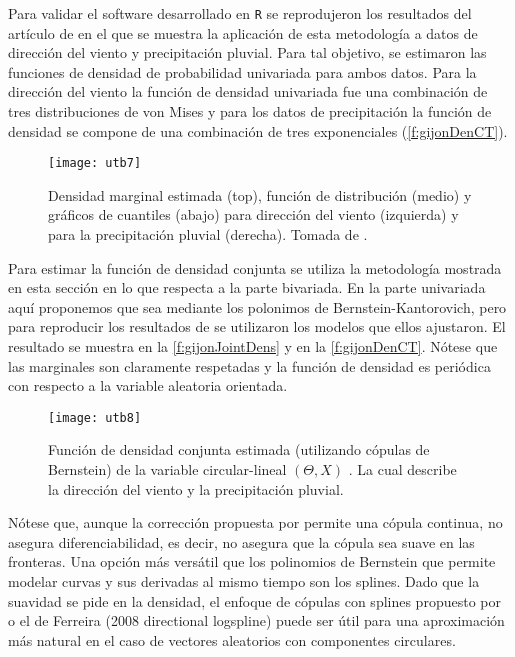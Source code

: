 Para validar el software desarrollado en \verb|R| se reprodujeron los resultados del art\'iculo de \citet{carnicero_non-parametric_2013} en el que se muestra la aplicaci\'on de esta metodolog\'ia a datos de direcci\'on del viento y precipitaci\'on pluvial. Para tal objetivo, se estimaron las funciones de densidad de probabilidad univariada para ambos datos. Para la direcci\'on del viento la funci\'on de densidad univariada fue una combinaci\'on de tres distribuciones de von Mises y para los datos de precipitaci\'on la funci\'on de densidad se compone de una combinaci\'on de tres exponenciales (\autoref{f:gijonDenCT}).

\begin{figure}
	\centering
\texttt{[image: utb7]}
	\caption{Densidad marginal estimada (top), funci\'on de distribuci\'on (medio) y gr\'aficos de cuantiles (abajo) para direcci\'on del viento (izquierda) y para la precipitaci\'on pluvial (derecha). Tomada de \cite{carnicero_non-parametric_2013}.}
	\label{f:gijonDenCT}
\end{figure}

Para estimar la funci\'on de densidad conjunta se utiliza la metodolog\'ia mostrada en esta secci\'on en lo que respecta a la parte bivariada. En la parte univariada aqu\'i proponemos que sea mediante los polonimos de Bernstein-Kantorovich, pero para reproducir los resultados de \citet{carnicero_non-parametric_2013} se utilizaron los modelos que ellos ajustaron. El resultado se muestra en la \autoref{f:gijonJointDens} y en la \autoref{f:gijonDenCT}. N\'otese que las marginales son claramente respetadas y la funci\'on de densidad es peri\'odica con respecto a la variable aleatoria orientada.

\begin{figure}[H]
	\centering
\texttt{[image: utb8]}
	\caption{Funci\'on de densidad conjunta estimada (utilizando c\'opulas de Bernstein) de la variable circular-lineal \(\left( \Theta,X \right)\) . La cual describe la direcci\'on del viento y la precipitaci\'on pluvial.}
	\label{f:gijonJointDens}
\end{figure}

N\'otese que, aunque la correcci\'on propuesta por \citet{carnicero_non-parametric_2013} permite una c\'opula continua, no asegura diferenciabilidad, es decir, no asegura que la c\'opula sea suave en las fronteras. Una opci\'on m\'as vers\'atil que los polinomios de Bernstein que permite modelar curvas y sus derivadas al mismo tiempo son los splines. Dado que la suavidad se pide en la densidad, el enfoque de c\'opulas con splines propuesto por \citet{schellhase_density_2012} o el de Ferreira (2008 directional logspline) puede ser \'util para una aproximaci\'on m\'as natural en el caso de vectores aleatorios con componentes circulares.

